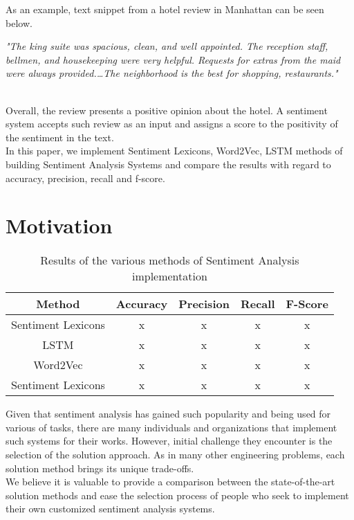 \documentclass[11pt,a4paper]{article}
\begin{document}
As an example, text snippet from a hotel review in Manhattan can be seen below.\\

\parbox{0.45\textwidth}{
	\centering
	\small
	\textit{
		"The king suite was spacious, clean, and well appointed. The reception staff, bellmen, and housekeeping were very helpful. Requests for extras from the maid were always provided.\ldots The neighborhood is the best for shopping, restaurants." \cite{ronen}
	}
}\\

Overall, the review presents a positive opinion about the hotel. A sentiment system accepts such review as an input and assigns a score to the positivity of the sentiment in the text. \\

In this paper, we implement Sentiment Lexicons, Word2Vec, LSTM methods of building Sentiment Analysis Systems and compare the results with regard to accuracy, precision, recall and f-score. 


\section{Motivation}

\begin{table*}[ht]
	\centering
	\begin{tabular}{| c | c | c | c | c |}
		\hline
		\textbf{Method} & \textbf{Accuracy} & \textbf{Precision} & \textbf{Recall} & \textbf{F-Score} \\ \hline
		Sentiment Lexicons & x & x & x & x\\ \hline
		LSTM & x & x & x & x\\ \hline
		Word2Vec & x & x & x & x\\ \hline
		Sentiment Lexicons & x & x & x & x\\ \hline
		\hline
	\end{tabular}
\caption{Results of the various methods of Sentiment Analysis implementation}
\end{table*}

Given that sentiment analysis has gained such popularity and being used for various of tasks, there are many individuals and organizations that implement such systems for their works. However, initial challenge they encounter is the selection of the solution approach. As in many other engineering problems, each solution method brings its unique trade-offs. \\

We believe it is valuable to provide a comparison between the state-of-the-art solution methods and ease the selection process of people who seek to implement their own customized sentiment analysis systems. \\
\end{document}
